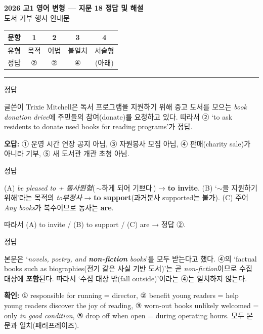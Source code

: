 \documentclass[11pt,a4paper]{article}
\newcommand{\sol}[2]{\vspace{6pt}{\sffamily\bfseries #1} \quad 정답 \fbox{#2}\par\vspace{1pt}}
\begin{document}
\begin{center}
{\fontsize{15}{17}\selectfont\sffamily\bfseries 2026 고1 영어 변형 — 지문 18 정답 및 해설}\\[2pt]
{\sffamily 도서 기부 행사 안내문}
\end{center}
\vspace{6pt}

\begin{center}
\renewcommand{\arraystretch}{1.4}
\begin{tabular}{|c|c|c|c|c|}
\hline
\sffamily 문항 & 1 & 2 & 3 & 4 \\\hline
\sffamily 유형 & \sffamily 목적 & \sffamily 어법 & \sffamily 불일치 & \sffamily 서술형 \\\hline
\sffamily 정답 & ② & ② & ④ & (아래) \\\hline
\end{tabular}
\end{center}
\vspace{8pt}\hrule\vspace{4pt}

\sol{1. 목적}{②}
글쓴이 Trixie Mitchell은 독서 프로그램을 지원하기 위해 중고 도서를 모으는 \textit{book donation drive}에 주민들의 참여(donate)를 요청하고 있다. 따라서 ② ‘to ask residents to donate used books for reading programs’가 정답.
\par\vspace{1pt}\textbf{오답:} ① 운영 시간 연장 공지 아님, ③ 자원봉사 모집 아님, ④ 판매(charity sale)가 아니라 기부, ⑤ 새 도서관 개관 초청 아님.

\sol{2. 어법}{②}
(A) \textit{be pleased to + 동사원형}(\,$\sim$하게 되어 기쁘다\,) → \textbf{to invite}. \quad
(B) ‘$\sim$을 지원하기 위해’라는 목적의 \textit{to부정사} → \textbf{to support}(과거분사 supported는 불가). \quad
(C) 주어 \textit{Any books}가 복수이므로 동사는 \textbf{are}. \par
따라서 (A) to invite / (B) to support / (C) are → 정답 ②.

\sol{3. 일치하지 않는 것}{④}
본문은 ‘\textit{novels, poetry, and \textbf{non-fiction} books}’를 모두 받는다고 했다. ④의 ‘factual books such as biographies(전기 같은 사실 기반 도서)’는 곧 \textit{non-fiction}이므로 수집 대상에 \textbf{포함}된다. 따라서 ‘수집 대상 밖(fall outside)’이라는 ④는 일치하지 않는다.
\par\vspace{1pt}\textbf{확인:} ① responsible for running = director, ② benefit young readers = help young readers discover the joy of reading, ③ worn-out books unlikely welcomed = only \textit{in good condition}, ⑤ drop off when open = during operating hours. 모두 본문과 일치(패러프레이즈).
\end{document}
